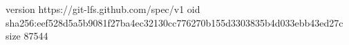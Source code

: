 version https://git-lfs.github.com/spec/v1
oid sha256:eef528d5a5b9081f27ba4ec32130cc776270b155d3303835b4d033ebb43ed27c
size 87544
